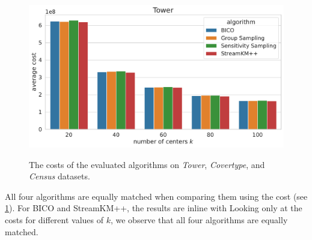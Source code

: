 \begin{figure}
  \includegraphics[width=.5\linewidth]{figures/costs-Tower.pdf}
  \newline \newline
  \newline \newline
  \newline \newline
  \label{fig:costs}
  \caption{The costs of the evaluated algorithms on \textit{Tower}, \textit{Covertype}, and \textit{Census} datasets.}
\end{figure}


All four algorithms are equally matched when comparing them using the cost (see \cref{fig:costs}). For BICO and StreamKM++, the results are inline with 
Looking only at the costs for different values of $k$, we observe that all four algorithms are equally matched. 